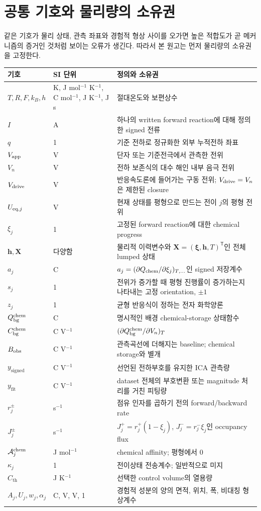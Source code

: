 \section{공통 기호와 물리량의 소유권}\label{ASM-NOTATION}

같은 기호가 물리 상태, 관측 좌표와 경험적 형상 사이를 오가면 높은
적합도가 곧 메커니즘의 증거인 것처럼 보이는 오류가 생긴다. 따라서
본 원고는 먼저 물리량의 소유권을 고정한다.

\begin{longtable}{p{}p{}p{}}
\toprule
기호 & SI 단위 & 정의와 소유권\\
\midrule\endhead
$T,R,F,k_B,h$ & K, J mol$^{-1}$ K$^{-1}$, C mol$^{-1}$, J K$^{-1}$, J s
& 절대온도와 보편상수\\
$I$ & A & 하나의 written forward reaction에 대해 정의한 signed 전류\\
$q$ & 1 & 기준 전하로 정규화한 외부 누적전하 좌표\\
$V_{\mathrm{app}}$ & V & 단자 또는 기준전극에서 관측한 전위\\
$V_n$ & V & 전하 보존식의 대수 해인 내부 음극 전위\\
$V_{\mathrm{drive}}$ & V & 반응속도론에 들어가는 구동 전위; $V_{\mathrm{drive}}=V_n$은 제한된 closure\\
$U_{\mathrm{eq},j}$ & V & 현재 상태를 평형으로 만드는 전이 $j$의 평형 전위\\
$\xi_j$ & 1 & 고정된 forward reaction에 대한 chemical progress\\
$\bm h,\bm X$ & 다양함 & 물리적 이력변수와
$\bm X=(\bm\xi,\bm h,T)^{\mathsf T}$인 전체 lumped 상태\\
$a_j$ & C & $a_j=(\partial Q_{\mathrm{chem}}/\partial\xi_j)_{T,\ldots}$인 signed 저장계수\\
$s_j$ & 1 & 전위가 증가할 때 평형 진행률이 증가하는지 나타내는 고정 orientation, $\pm1$\\
$z_j$ & 1 & 균형 반응식이 정하는 전자 화학양론\\
$Q_{\mathrm{bg}}^{\mathrm{chem}}$ & C & 명시적인 배경 chemical-storage 상태함수\\
$C_{\mathrm{bg}}^{\mathrm{chem}}$ & C V$^{-1}$ & $(\partial Q_{\mathrm{bg}}^{\mathrm{chem}}/\partial V_n)_T$\\
$B_{\mathrm{obs}}$ & C V$^{-1}$ & 관측곡선에 더해지는 baseline; chemical storage와 별개\\
$y_\mathrm{signed}$ & C V$^{-1}$ & 선언된 전하부호를 유지한 ICA 관측량\\
$y_\mathrm{fit}$ & C V$^{-1}$ & dataset 전체의 부호변환 또는 magnitude 처리를 거친 피팅량\\
$r_j^\pm$ & s$^{-1}$ & 점유 인자를 곱하기 전의 forward/backward rate\\
$J_j^\pm$ & s$^{-1}$ & $J_j^+=r_j^+(1-\xi_j)$, $J_j^-=r_j^-\xi_j$인 occupancy flux\\
$\mathcal A_j^{\mathrm{chem}}$ & J mol$^{-1}$ & chemical affinity; 평형에서 0\\
$\kappa_j$ & 1 & 전이상태 전송계수; 일반적으로 미지\\
$C_\mathrm{th}$ & J K$^{-1}$ & 선택한 control volume의 열용량\\
$A_j,U_j,w_j,\alpha_j$ & C, V, V, 1 & 경험적 성분의 양의 면적, 위치, 폭, 비대칭 형상계수\\
\bottomrule
\end{longtable}

